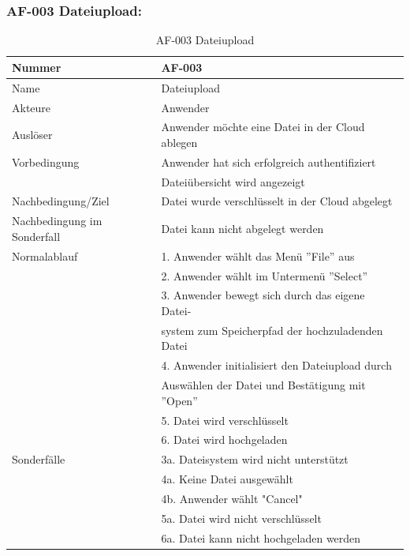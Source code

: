 \documentclass[13pt,a4paper,bibliography=totocnumbered,listof=totocnumbered]{scrartcl}
\begin{document}
\subsubsection{AF-003 Dateiupload:}
\begin{table}[!h]
	\centering
	\begin{tabular}{|l|l|}
		\hline
		Nummer & AF-003\\
		\hline
		Name & Dateiupload\\
		\hline
		Akteure & Anwender\\
		\hline
		Auslöser & Anwender möchte eine Datei in der Cloud ablegen\\
		\hline
		Vorbedingung & Anwender hat sich erfolgreich authentifiziert \\ & Dateiübersicht wird angezeigt\\
		\hline
		Nachbedingung/Ziel & Datei wurde verschlüsselt in der Cloud abgelegt \\
		\hline
		Nachbedingung im Sonderfall & Datei kann nicht abgelegt werden\\
		\hline
		Normalablauf & 1. Anwender wählt das Menü ''File'' aus \\ & 2. Anwender wählt im Untermenü ''Select'' \\ & 3. Anwender bewegt sich durch das eigene  Datei- \\ & system zum Speicherpfad der hochzuladenden Datei \\ & 4. Anwender initialisiert den Dateiupload durch \\ &  Auswählen der Datei und Bestätigung mit ''Open'' \\  & 5. Datei wird verschlüsselt \\ & 6. Datei wird hochgeladen \\
		\hline
		Sonderfälle & 3a. Dateisystem wird nicht unterstützt \\& 4a. Keine Datei ausgewählt \\ & 4b. Anwender wählt "Cancel" \\ &  5a. Datei wird nicht verschlüsselt \\ & 6a. Datei kann nicht hochgeladen werden\\
		\hline
	\end{tabular}
	\caption{AF-003 Dateiupload}
	\label{tab:AF-003 Dateiupload}
\end{table}
\pagebreak
\end{document}
